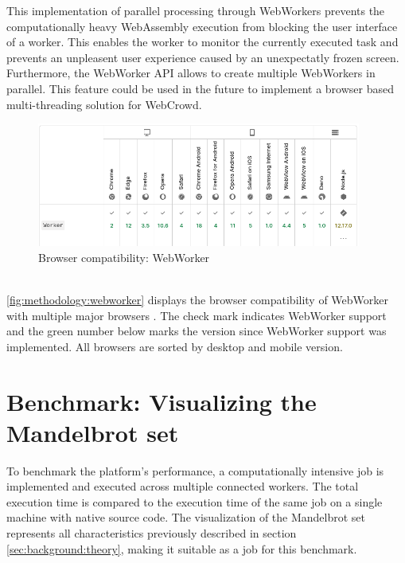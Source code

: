 This implementation of parallel processing through WebWorkers prevents the computationally heavy WebAssembly execution from blocking the user interface of a worker. This enables the worker to monitor the currently executed task and prevents an unpleasent user experience caused by an unexpectatly frozen screen. Furthermore, the WebWorker \ac{API} allows to create multiple WebWorkers in parallel. This feature could be used in the future to implement a browser based multi-threading solution for WebCrowd.
\begin{figure}[htbp]
  \centering
  \includegraphics[width=0.95\textwidth]{gfx/figures/webworker-browsercompability.png}
  \caption{Browser compatibility: WebWorker \cite{methodology:webworkers}}
  \label{fig:methodology:webworker}
\end{figure}
~\\
\autoref{fig:methodology:webworker} displays the browser compatibility of WebWorker with multiple major browsers \cite{methodology:webworkers}. The check mark indicates WebWorker support and the green number below marks the version since WebWorker support was implemented. All browsers are sorted by desktop and mobile version. 

\section{Benchmark: Visualizing the Mandelbrot set}
\label{sec:methodology:benchmark}
To benchmark the platform's performance, a computationally intensive job is implemented and executed across multiple connected workers. The total execution time is compared to the execution time of the same job on a single machine with native source code. The visualization of the Mandelbrot set represents all characteristics previously described in section \ref{sec:background:theory}, making it suitable as a job for this benchmark.

